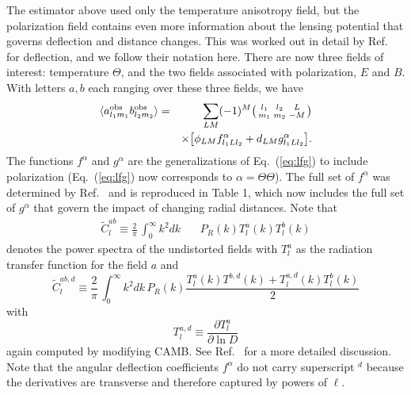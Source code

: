\documentclass[prd,amsmath,amssymb,floatfix,superscriptaddress,nofootinbib,twocolumn]{revtex4-1}
\def\be{\begin{equation}}
\def\ee{\end{equation}}
\def\bea{\begin{eqnarray}}
\def\eea{\end{eqnarray}}
\newcommand{\vs}{\nonumber\\}
\newcommand{\ec}[1]{Eq.~(\ref{eq:#1})}
\begin{document}
The estimator above used only the temperature anisotropy field, but the polarization field contains even more information about the lensing potential that governs deflection and distance changes. This was worked out in detail by Ref.~\cite{Okamoto:2003zw} for deflection, and we follow their notation here. There are now three fields of interest: temperature $\Theta$, and the two fields associated with polarization, $E$ and $B$. With letters $a,b$ each ranging over these three fields, we have 
\bea
\langle a^{\rm obs}_{l_{1}m_{1}}b^{\rm obs}_{l_{2}m_{2}}\rangle &=& \sum_{LM}(-1)^{M}\bigl(\begin{smallmatrix} l_1 & l_2 & L \\ m_1 & m_2 & -M  \end{smallmatrix}\bigr)\nonumber \\
&&\times
\big[ \phi_{LM}f^{\alpha}_{l_{1}Ll_{2}} + d_{LM}g^{\alpha}_{l_{1}Ll_{2}} \big] 
.\eea
The functions $f^\alpha$ and $g^\alpha$ are the generalizations of \ec{lfg} to include polarization (\ec{lfg} now corresponds to $\alpha=\Theta\Theta$). The full set of $f^{\alpha}$ was determined by Ref.~\cite{Okamoto:2003zw} and is reproduced in Table 1, which now includes the full set of $g^{\alpha}$ that govern the impact of changing radial distances. Note
that
\bea
\tilde{C}^{ab}_{l} \equiv \frac{2}{\pi}\,\int_0^\infty k^{2}dk \,&&{P}_{R}(k) T^{a}_l(k) T^b_l(k) \eea
denotes the power spectra of the undistorted fields with $T_l^a$ as the radiation transfer
function for the field $a$ and \be
\tilde{C}^{ab,d}_{l} \equiv  \frac{2}{\pi}\,\int_0^\infty k^{2}dk \,{P}_{R}(k)\frac{T_l^{a}(k)T^{b,d}(k)+T_l^{a,d}(k)T_l^{b}(k)}{2} 
\ee
with 
\begin{equation}
T_l^{a,d} \equiv \frac{\partial T_l^a}{\partial \ln D}
\end{equation}
again computed by modifying CAMB.  
 See Ref.~\cite{Hu:1997de} for a more detailed discussion.
Note that the angular deflection coefficients $f^\alpha$ do not carry superscript $^d$ because the derivatives are transverse and therefore captured by powers of $\ell$. 
\end{document}
